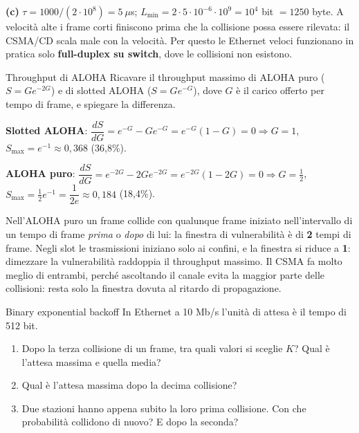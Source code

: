 \textbf{(c)} $\tau = 1000 / (2\cdot 10^8) = 5\ \mu$s; $L_{\min} = 2 \cdot 5\cdot 10^{-6} \cdot 10^9 = 10^4$ bit $= 1250$ byte.
A velocità alte i frame corti finiscono prima che la collisione possa essere rilevata: il CSMA/CD scala male con la velocità. Per
questo le Ethernet veloci funzionano in pratica solo \textbf{full-duplex su switch}, dove le collisioni non esistono.

\begin{esercizio}{Throughput di ALOHA}
Ricavare il throughput massimo di ALOHA puro ($S = G e^{-2G}$) e di slotted ALOHA ($S = G e^{-G}$), dove $G$ è il carico offerto
per tempo di frame, e spiegare la differenza.
\end{esercizio}

\svolgimento
\textbf{Slotted ALOHA}: $\dfrac{dS}{dG} = e^{-G} - G e^{-G} = e^{-G}(1 - G) = 0 \Rightarrow G = 1$, \quad
$S_{\max} = e^{-1} \approx 0{,}368$ (36,8\%).

\textbf{ALOHA puro}: $\dfrac{dS}{dG} = e^{-2G} - 2G e^{-2G} = e^{-2G}(1 - 2G) = 0 \Rightarrow G = \tfrac12$, \quad
$S_{\max} = \tfrac12 e^{-1} = \dfrac{1}{2e} \approx 0{,}184$ (18,4\%).

Nell'ALOHA puro un frame collide con qualunque frame iniziato nell'intervallo di un tempo di frame \emph{prima} o \emph{dopo} di
lui: la finestra di vulnerabilità è di \textbf{2} tempi di frame. Negli slot le trasmissioni iniziano solo ai confini, e la finestra
si riduce a \textbf{1}: dimezzare la vulnerabilità raddoppia il throughput massimo. Il CSMA fa molto meglio di entrambi, perché
ascoltando il canale evita la maggior parte delle collisioni: resta solo la finestra dovuta al ritardo di propagazione.

\begin{esercizio}{Binary exponential backoff}
In Ethernet a 10 Mb/s l'unità di attesa è il tempo di 512 bit.
\begin{enumerate}[label=(\alph*)]
    \item Dopo la terza collisione di un frame, tra quali valori si sceglie $K$? Qual è l'attesa massima e quella media?
    \item Qual è l'attesa massima dopo la decima collisione?
    \item Due stazioni hanno appena subito la loro prima collisione. Con che probabilità collidono di nuovo? E dopo la seconda?
\end{enumerate}
\end{esercizio}

